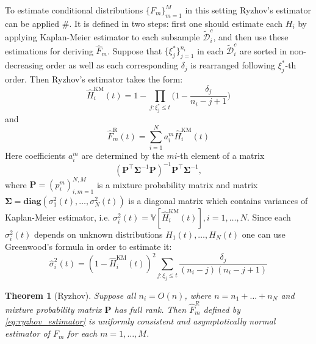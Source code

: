 \documentclass[12pt,reqno,a4paper,oneside]{article}
\theoremstyle{plain}
\newtheorem{thm}{Theorem}[section]
\theoremstyle{definition}
\theoremstyle{remark}
\begin{document}
To estimate conditional distributions $\{F_m\}_{m=1}^M$ in this setting Ryzhov's estimator can be applied $\#$. It is defined in two steps: first one should estimate each $H_i$ by applying Kaplan-Meier estimator to each subsample $\tilde{\mathcal D}^c_i$, and then use these estimations for deriving $\hat F_m$. Suppose that $\{\xi ^* _{j} \}_{j=1}^{n_i}$ in each $\tilde{\mathcal D}_i^c$ are sorted in non-decreasing order as well as each corresponding $\delta_j$ is rearranged following $\xi ^* _j$-th order. Then Ryzhov's estimator takes the form:
\begin{equation}
\hat H^{\mathrm{KM}}_i (t) = 1 - \prod _{j:\xi ^*_{j} \leq t} \Bigg(1 - \frac {\delta _{j}}{n_i - j + 1}\Bigg)
\end{equation}
and
\begin{equation}
\label{eq:ryzhov_estimator}
\hat F^{\mathrm{R}}_m(t) = \sum _{i=1}^N a_i^m \hat H^{\mathrm{KM}}_i(t)
\end{equation}
Here coefficients $a_i^m$ are determined by the $mi$-th element of a matrix
\begin{equation}
(\mathbf P^\top \boldsymbol{\Sigma}^{-1}\mathbf P)^{-1} \mathbf P^\top \boldsymbol{\Sigma}^{-1},
\end{equation}
where $\mathbf P = (p_i^m)_{i,m=1}^{N,M}$ is a mixture probability matrix and matrix $\boldsymbol{\Sigma} = \mathbf{diag}(\sigma ^2 _1(t), \ldots, \sigma ^2 _N(t))$ is a diagonal matrix which contains variances of Kaplan-Meier estimator, i.e. $\sigma ^2_i(t) = \mathbb V [\hat H^{\mathrm{KM}}_i(t)], i=1,\ldots, N$. Since each $\sigma ^2_i(t)$ depends on unknown distributions $H_1(t), \ldots, H_N(t)$ one can use Greenwood's formula in order to estimate it:
\begin{equation}
\hat \sigma ^2_i (t) = (1 - \hat H^{\mathrm{KM}}_i(t))^2 \sum _{j:\xi _{j} \leq t}\frac {\delta _{j}}{(n_i - j)(n_i - j + 1)}
\end{equation}
\begin{thm}[Ryzhov]
Suppose all $n_i = O(n)$, where $n = n_1 + \ldots + n_N$ and mixture probability matrix $\mathbf P$ has full rank. Then $\hat F^R_m$ defined by \eqref{eq:ryzhov_estimator} is uniformly consistent and asymptotically normal estimator of $F_m$ for each $m=1,\ldots , M$.
\end{thm}
\end{document}
